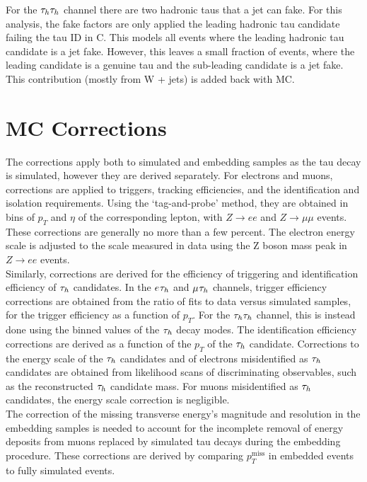 For the $\tau_{h}\tau_{h}$ channel there are two hadronic taus that a jet can fake.
For this analysis, the fake factors are only applied the leading hadronic tau candidate failing the tau ID in C.
This models all events where the leading hadronic tau candidate is a jet fake.
However, this leaves a small fraction of events, where the leading candidate is a genuine tau and the sub-leading candidate is a jet fake.
This contribution (mostly from W + jets) is added back with MC.

\section{MC Corrections}

The corrections apply both to simulated and embedding samples as the tau decay is simulated, however they are derived separately. 
For electrons and muons, corrections are applied to triggers, tracking efficiencies, and the identification and isolation requirements.
Using the `tag-and-probe' method, they are obtained in bins of $p_T$ and $\eta$ of the corresponding lepton, with $Z\rightarrow ee$ and $Z\rightarrow\mu\mu$ events. 
These corrections are generally no more than a few percent. 
The electron energy scale is adjusted to the scale measured in data using the Z boson mass peak in $Z\rightarrow ee$ events. \\

Similarly, corrections are derived for the efficiency of triggering and identification efficiency of $\tau_{h}$ candidates. 
In the $e_{}\tau_{h}$ and $\mu_{}\tau_{h}$ channels, trigger efficiency corrections are obtained from the ratio of fits to data versus simulated samples, for the trigger efficiency as a function of $p_{T}$. 
For the $\tau_{h}\tau_{h}$ channel, this is instead done using the binned values of the $\tau_{h}$ decay modes.
The identification efficiency corrections are derived as a function of the $p_T$ of the $\tau_{h}$ candidate. 
Corrections to the energy scale of the $\tau_{h}$ candidates and of electrons misidentified as $\tau_{h}$ candidates are obtained from likelihood scans of discriminating observables, such as the reconstructed $\tau_{h}$ candidate mass. 
For muons misidentified as $\tau_{h}$ candidates, the energy scale correction is negligible. \\

The correction of the missing transverse energy's magnitude and resolution in the embedding samples is needed to account for the incomplete removal of energy deposits from muons replaced by simulated tau decays during the embedding procedure. 
These corrections are derived by comparing $p_{T}^{\text{miss}}$ in embedded events to fully simulated events. \\

